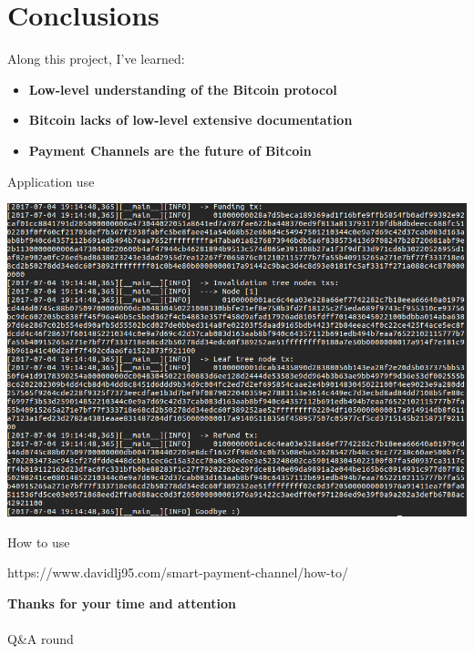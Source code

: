 \documentclass{beamer}
\begin{document}
\section{Conclusions}
\begin{frame}
 Along this project, I've learned:
 \begin{itemize}
  \item \textbf{Low-level understanding of the Bitcoin protocol}
  \item \textbf{Bitcoin lacks of low-level extensive documentation}
  \item \textbf{Payment Channels are the future of Bitcoin}
 \end{itemize}
\end{frame}
\begin{frame}{Application use}
 \begin{center}
  \includegraphics[width=\textwidth, height=0.6\textheight, keepaspectratio]{img/app.png}
 \end{center}
 \begin{block}{How to use}
  \begin{center}
   https://www.davidlj95.com/smart-payment-channel/how-to/
  \end{center}
 \end{block}
\end{frame}
\begin{frame}
 \begin{center}
  \textbf{\huge{Thanks for your time and attention}}\\~\\
  \huge{Q\&A round}
 \end{center}
\end{frame}
\end{document}
